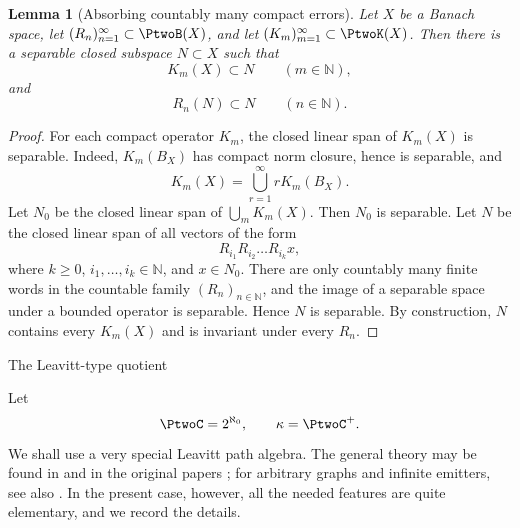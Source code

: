 \documentclass[11pt,reqno]{amsart}
\makeatletter
\theoremstyle{plain}
\newtheorem{lemma}[lemma]{Lemma}
\theoremstyle{definition}
\newcommand{\N}{\mathbb N}
\newcounter{problempaper}
\newenvironment{problempaperbody}{%
  \setcounter{subsection}{0}%
  \setcounter{subsubsection}{0}%
  \setcounter{paragraph}{0}%
  \renewcommand{\thesubsection}{\arabic{subsection}}%
  \renewcommand{\thesubsubsection}{\thesubsection.\arabic{subsubsection}}%
  \renewcommand{\theparagraph}{\thesubsubsection.\arabic{paragraph}}%
  \let\problem@outersection\section
  \let\problem@outersubsection\subsection
  \let\problem@outersubsubsection\subsubsection
  \let\problem@outerparagraph\paragraph
  \let\section\problem@papersection
  \let\subsection\problem@papersubsection
  \let\subsubsection\problem@papersubsubsection
}{%
  \let\section\problem@outersection
  \let\subsection\problem@outersubsection
  \let\subsubsection\problem@outersubsubsection
  \let\paragraph\problem@outerparagraph
}
\newcommand{\problem@target}[2]{%
  \hypertarget{problem-\theproblempaper-#1-#2}{}%
}
\newcommand{\problem@paperheading}[3]{%
  \par\bigskip
  \problem@target{#1}{#2}%
  \noindent{\large\bfseries #2.\quad #3\par}%
  \nobreak\smallskip
}
\newcommand{\problem@papersubheading}[3]{%
  \par\medskip
  \problem@target{#1}{#2}%
  \noindent{\normalsize\bfseries #2.\quad #3\par}%
  \nobreak\smallskip
}
\newcommand{\problem@papersubsubheading}[3]{%
  \par\smallskip
  \problem@target{#1}{#2}%
  \noindent{\normalsize\itshape #2.\quad #3.\ }%
}
\def\problem@papersection{%
  \@ifstar{\problem@papersectionstar}{\problem@papersectionnostar}%
}
\def\problem@papersectionstar#1{%
  \par\bigskip\noindent{\large\bfseries #1\par}\nobreak\smallskip
}
\def\problem@papersectionnostar#1{%
  \refstepcounter{subsection}%
  \setcounter{subsubsection}{0}%
  \setcounter{paragraph}{0}%
  \problem@paperheading{section}{\thesubsection}{#1}%
  \problem@writecontentsline{section}{\thesubsection}{#1}%
}
\def\problem@papersubsection{%
  \@ifstar{\problem@papersubsectionstar}{\problem@papersubsectionnostar}%
}
\def\problem@papersubsectionstar#1{%
  \par\medskip\noindent{\normalsize\bfseries #1\par}\nobreak\smallskip
}
\def\problem@papersubsectionnostar#1{%
  \refstepcounter{subsubsection}%
  \setcounter{paragraph}{0}%
  \problem@papersubheading{subsection}{\thesubsubsection}{#1}%
  \problem@writecontentsline{subsection}{\thesubsubsection}{#1}%
}
\def\problem@papersubsubsection{%
  \@ifstar{\problem@papersubsubsectionstar}{\problem@papersubsubsectionnostar}%
}
\def\problem@papersubsubsectionstar#1{%
  \par\smallskip\noindent{\normalsize\itshape #1.\ }%
}
\def\problem@papersubsubsectionnostar#1{%
  \refstepcounter{paragraph}%
  \problem@papersubsubheading{subsubsection}{\theparagraph}{#1}%
  \problem@writecontentsline{subsubsection}{\theparagraph}{#1}%
}
\newcommand{\problem@writecontentsline}[3]{%
  \begingroup
  \protected@write\@auxout{}{%
    \string\problemcontentsentry{\theproblempaper}{#1}{#2}{#3}{\thepage}%
  }%
  \endgroup
}
\newcommand{\problemcontentsentry}[5]{%
  \@ifundefined{problemcontents@#1}{%
    \expandafter\gdef\csname problemcontents@#1\endcsname{}%
  }{}%
  \expandafter\g@addto@macro\csname problemcontents@#1\endcsname{%
    \problemcontentsline{#1}{#2}{#3}{#4}{#5}%
  }%
}
\newcommand{\problemcontentslink}[4]{%
  \hyperlink{problem-#1-#2-#3}{#4}%
}
\newcommand{\problemcontentsline}[5]{%
  \ifstrequal{#2}{section}{%
    \par\noindent
    \problemcontentslink{#1}{#2}{#3}{\makebox[2.5em][l]{#3}#4}%
    \nobreak\dotfill
    \problemcontentslink{#1}{#2}{#3}{#5}\par
  }{%
    \ifstrequal{#2}{subsection}{%
      \par\noindent\hspace*{1.5em}%
      \problemcontentslink{#1}{#2}{#3}{\makebox[3.5em][l]{#3}#4}%
      \nobreak\dotfill
      \problemcontentslink{#1}{#2}{#3}{#5}\par
    }{%
      \par\noindent\hspace*{3em}%
      \problemcontentslink{#1}{#2}{#3}{\makebox[4.5em][l]{#3}#4}%
      \nobreak\dotfill
      \problemcontentslink{#1}{#2}{#3}{#5}\par
    }%
  }%
}
\makeatother
\begin{document}
\begin{problempaperbody}
\begin{lemma}[Absorbing countably many compact errors]
\label{p2-first:lem:absorb}
Let $X$ be a Banach space, let $(R_n)_{n=1}^{\infty}\subset\PtwoB(X)$, and let $(K_m)_{m=1}^{\infty}\subset\PtwoK(X)$. Then there is a separable closed subspace $N\subset X$ such that
\begin{equation*}
        K_m(X)\subset N \qquad(m\in\N),
\end{equation*}
and
\begin{equation*}
        R_n(N)\subset N \qquad(n\in\N).
\end{equation*}
\end{lemma}

\begin{proof}
For each compact operator $K_m$, the closed linear span of $K_m(X)$ is separable. Indeed, $K_m(B_X)$ has compact norm closure, hence is separable, and
\begin{equation*}
        K_m(X)=\bigcup_{r=1}^{\infty}rK_m(B_X).
\end{equation*}
Let $N_0$ be the closed linear span of $\bigcup_mK_m(X)$. Then $N_0$ is separable. Let $N$ be the closed linear span of all vectors of the form
\begin{equation*}
        R_{i_1}R_{i_2}\ldots R_{i_k}x,
\end{equation*}
where $k\geq0$, $i_1,\ldots,i_k\in\N$, and $x\in N_0$. There are only countably many finite words in the countable family $(R_n)_{n \in \N}$, and the image of a separable space under a bounded operator is separable. Hence $N$ is separable. By construction, $N$ contains every $K_m(X)$ and is invariant under every $R_n$.
\end{proof}

\subsection{The Leavitt-type quotient}
\label{p2-first:sec:leavitt-construction}

Let
\begin{equation*}
        \PtwoC=2^{\aleph_0}, \qquad \kappa=\PtwoC^+.
\end{equation*}
We shall use a very special Leavitt path algebra. The general theory may be found in \cite[Chapter 1]{AbramsAraSiles2017} and in the original papers \cite{AbramsArandaPino2005,AraMorenoPardo2007}; for arbitrary graphs and infinite emitters, see also \cite{Goodearl2009,Tomforde2007}. In the present case, however, all the needed features are quite elementary, and we record the details.


\end{problempaperbody}
\end{document}
